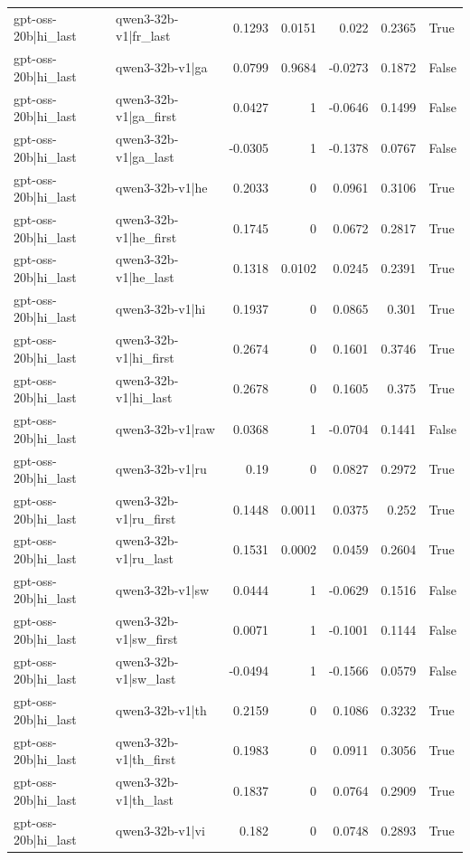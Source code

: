 \begin{table}
\begin{tabular}{l l r r r r l}
gpt-oss-20b|hi_last & qwen3-32b-v1|fr_last & 0.1293 & 0.0151 & 0.022 & 0.2365 & True \\
gpt-oss-20b|hi_last & qwen3-32b-v1|ga & 0.0799 & 0.9684 & -0.0273 & 0.1872 & False \\
gpt-oss-20b|hi_last & qwen3-32b-v1|ga_first & 0.0427 & 1 & -0.0646 & 0.1499 & False \\
gpt-oss-20b|hi_last & qwen3-32b-v1|ga_last & -0.0305 & 1 & -0.1378 & 0.0767 & False \\
gpt-oss-20b|hi_last & qwen3-32b-v1|he & 0.2033 & 0 & 0.0961 & 0.3106 & True \\
gpt-oss-20b|hi_last & qwen3-32b-v1|he_first & 0.1745 & 0 & 0.0672 & 0.2817 & True \\
gpt-oss-20b|hi_last & qwen3-32b-v1|he_last & 0.1318 & 0.0102 & 0.0245 & 0.2391 & True \\
gpt-oss-20b|hi_last & qwen3-32b-v1|hi & 0.1937 & 0 & 0.0865 & 0.301 & True \\
gpt-oss-20b|hi_last & qwen3-32b-v1|hi_first & 0.2674 & 0 & 0.1601 & 0.3746 & True \\
gpt-oss-20b|hi_last & qwen3-32b-v1|hi_last & 0.2678 & 0 & 0.1605 & 0.375 & True \\
gpt-oss-20b|hi_last & qwen3-32b-v1|raw & 0.0368 & 1 & -0.0704 & 0.1441 & False \\
gpt-oss-20b|hi_last & qwen3-32b-v1|ru & 0.19 & 0 & 0.0827 & 0.2972 & True \\
gpt-oss-20b|hi_last & qwen3-32b-v1|ru_first & 0.1448 & 0.0011 & 0.0375 & 0.252 & True \\
gpt-oss-20b|hi_last & qwen3-32b-v1|ru_last & 0.1531 & 0.0002 & 0.0459 & 0.2604 & True \\
gpt-oss-20b|hi_last & qwen3-32b-v1|sw & 0.0444 & 1 & -0.0629 & 0.1516 & False \\
gpt-oss-20b|hi_last & qwen3-32b-v1|sw_first & 0.0071 & 1 & -0.1001 & 0.1144 & False \\
gpt-oss-20b|hi_last & qwen3-32b-v1|sw_last & -0.0494 & 1 & -0.1566 & 0.0579 & False \\
gpt-oss-20b|hi_last & qwen3-32b-v1|th & 0.2159 & 0 & 0.1086 & 0.3232 & True \\
gpt-oss-20b|hi_last & qwen3-32b-v1|th_first & 0.1983 & 0 & 0.0911 & 0.3056 & True \\
gpt-oss-20b|hi_last & qwen3-32b-v1|th_last & 0.1837 & 0 & 0.0764 & 0.2909 & True \\
gpt-oss-20b|hi_last & qwen3-32b-v1|vi & 0.182 & 0 & 0.0748 & 0.2893 & True \\

\end{tabular}
\end{table}

